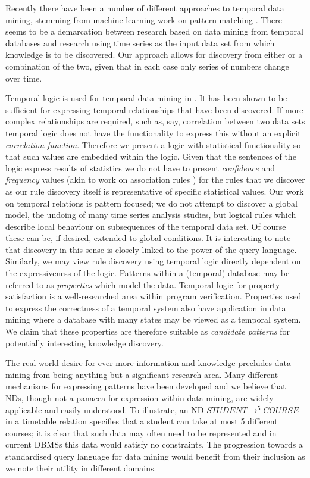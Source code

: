 \medskip

Recently there have been a number of different approaches to temporal
data mining, stemming from machine learning work on pattern
matching \cite{lai93,alss95}. There seems to be a demarcation between research based on
data mining from temporal databases and research using time series as
the input data set from which knowledge is to be discovered. Our
approach allows for discovery from either or a combination of the
two, given that in each case only series of
numbers change over time. 

\medskip

Temporal logic is used for temporal data mining in
\cite{pt96,bt98}. It has been shown to be sufficient for expressing
temporal relationships that have been discovered. If more complex
relationships are required, such as, say, correlation between two data
sets temporal logic does not have the functionality to express this
without an explicit {\em correlation function}. Therefore
we present a logic with statistical
functionality so that such values are embedded within the logic. Given
that the sentences of the logic express results of statistics
we do not have to present {\em confidence} and
{\em frequency} values (akin to work
on association rules \cite{ais93,kmrtv94,hkmt95}) for the rules that
we discover as our rule discovery 
itself is representative of specific statistical values. Our work on
temporal relations is pattern focused; we do 
not attempt to discover a global model, the undoing of many time
series analysis studies, but logical rules which describe local behaviour
on subsequences of the temporal data set. Of course these can be, if
desired, extended to global conditions.
It is interesting to note that discovery in this
sense is closely linked to the power of the query language. Similarly,
we may view rule discovery using temporal logic directly dependent on
the expressiveness of the logic.
Patterns within a (temporal) database may be referred to as {\em properties}
which model the data. Temporal logic for property satisfaction is a
well-researched area within program verification. Properties used to
express the correctness of a temporal system also have application
in data mining where a database with many states may be viewed as a
temporal system. We claim that these properties are therefore suitable
as {\em candidate patterns} for potentially interesting knowledge
discovery. 

\medskip

The real-world desire for ever more information and knowledge
precludes data mining from being anything but a significant research
area. Many different mechanisms for expressing patterns have been
developed and we believe that NDs, though not a panacea for expression
within data mining, are widely applicable and easily understood. 
To illustrate, an ND $STUDENT \to^5 COURSE$ in a timetable relation
specifies that a student can take at most 5 different courses; it is
clear that such data may often need to be represented and in current
DBMSs this data would satisfy no constraints.
The progression towards a standardised query language for data mining
\cite{cha98} 
would benefit from their inclusion as we note their utility in
different domains.

